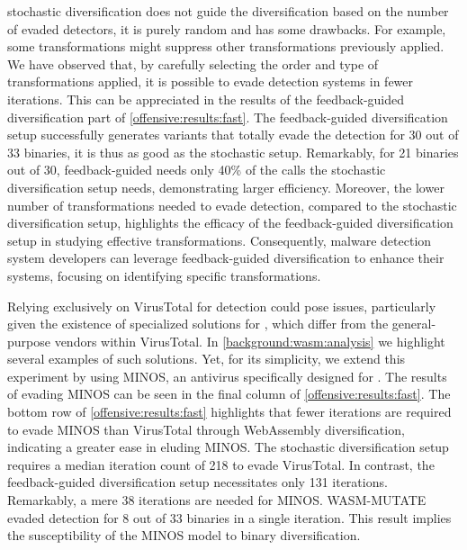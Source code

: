 \begin{strategy}
    \label{guided_div_vt}
    stochastic diversification does not guide the diversification based on the number of evaded detectors, it is purely random and has some drawbacks.
    For example, some transformations might suppress other transformations previously applied.
    We have observed that, by carefully selecting the order and type of transformations applied, it is possible to evade detection systems in fewer iterations.
    This can be appreciated in the results of the feedback-guided diversification part of \autoref{offensive:results:fast}.
    The feedback-guided diversification setup successfully generates variants that totally evade the detection for 30 out of 33 binaries, it is thus as good as the stochastic setup.
    Remarkably, for 21 binaries out of 30, feedback-guided needs only 40\% of the calls the stochastic diversification setup needs, demonstrating larger efficiency. 
    Moreover, the lower number of transformations needed to evade detection, compared to the stochastic diversification setup, highlights the efficacy of the feedback-guided diversification setup in studying effective transformations.
    Consequently, malware detection system developers can leverage feedback-guided diversification to enhance their systems, focusing on identifying specific transformations.



\end{strategy}
  
\begin{strategy}
    \label{stochastic_div_minos}
    Relying exclusively on VirusTotal for detection could pose issues, particularly given the existence of specialized solutions for \Wasm, which differ from the general-purpose vendors within VirusTotal. 
    In \autoref{background:wasm:analysis} we highlight several examples of such solutions.
    Yet, for its simplicity, we extend this experiment by using MINOS\cite{MINOS}, an antivirus specifically designed for \Wasm. 
    The results of evading MINOS can be seen in the final column of \autoref{offensive:results:fast}.
    The bottom row of \autoref{offensive:results:fast} highlights that fewer iterations are required to evade MINOS than VirusTotal through WebAssembly diversification, indicating a greater ease in eluding MINOS.
    The stochastic diversification setup requires a median iteration count of 218 to evade VirusTotal. 
    In contrast, the feedback-guided diversification setup necessitates only 131 iterations. 
    Remarkably, a mere 38 iterations are needed for MINOS. 
    WASM-MUTATE evaded detection for 8 out of 33 binaries in a single iteration. 
    This result implies the susceptibility of the MINOS model to binary diversification.
\end{strategy}
    
